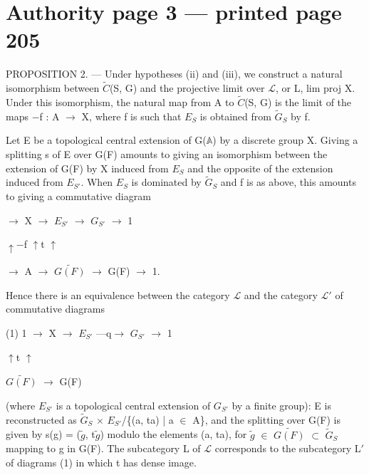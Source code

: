 \documentclass[10pt,a4paper]{article}
\begin{document}
\section*{Authority page 3 --- printed page 205}
\noindent PROPOSITION 2. — Under hypotheses (ii) and (iii), we construct a natural isomorphism between \ensuremath{\widetilde{C}}(S, G) and the projective limit over \ensuremath{ℒ}, or L, lim proj X. Under this isomorphism, the natural map from A to \ensuremath{\widetilde{C}}(S, G) is the limit of the maps \ensuremath{−}f : A \ensuremath{→} X, where f is such that \ensuremath{E_S} is obtained from \ensuremath{\widetilde{G}_S} by f.\par
\smallskip
\noindent Let E be a topological central extension of G(\ensuremath{𝔸}) by a discrete group X. Giving a splitting s of E over G(F) amounts to giving an isomorphism between the extension of G(F) by X induced from \ensuremath{E_S} and the opposite of the extension induced from \ensuremath{E_{S′}}. When \ensuremath{E_S} is dominated by \ensuremath{\widetilde{G}_S} and f is as above, this amounts to giving a commutative diagram\par
\smallskip
{} \ensuremath{→} X \ensuremath{→} \ensuremath{E_{S′}} \ensuremath{→} \ensuremath{G_{S′}} \ensuremath{→} 1\par
\noindent     \ensuremath{↑−}f    \ensuremath{↑}t         \ensuremath{↑}\par
{} \ensuremath{→} A \ensuremath{→} \ensuremath{\widetilde{G(F)}} \ensuremath{→} G(F) \ensuremath{→} 1.\par
\smallskip
\noindent Hence there is an equivalence between the category \ensuremath{ℒ} and the category \ensuremath{ℒ′} of commutative diagrams\par
\smallskip
\noindent (1)    1 \ensuremath{→} X \ensuremath{→} \ensuremath{E_{S′}} —q\ensuremath{→} \ensuremath{G_{S′}} \ensuremath{→} 1\par
\noindent                  \ensuremath{↑}t          \ensuremath{↑}\par
\noindent               \ensuremath{\widetilde{G(F)}} \ensuremath{→} G(F)\par
\smallskip
\noindent (where \ensuremath{E_{S′}} is a topological central extension of \ensuremath{G_{S′}} by a finite group): E is reconstructed as \ensuremath{\widetilde{G}_S} \ensuremath{×} \ensuremath{E_{S′}}/\{(a, ta) | a \ensuremath{∈} A\}, and the splitting over G(F) is given by s(g) = (\ensuremath{\widetilde{g}}, t\ensuremath{\widetilde{g}}) modulo the elements (a, ta), for \ensuremath{\widetilde{g}} \ensuremath{∈} \ensuremath{\widetilde{G(F)}} \ensuremath{⊂} \ensuremath{\widetilde{G}_S} mapping to g in G(F). The subcategory L of \ensuremath{ℒ} corresponds to the subcategory L\ensuremath{′} of diagrams (1) in which t has dense image.\par
\end{document}
